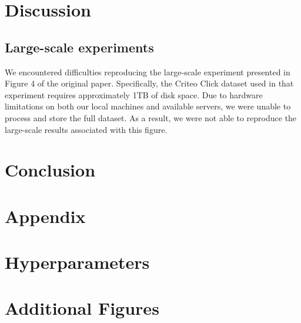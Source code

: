 \documentclass[a4paper,twocolumn]{article} %
\begin{document}
\begin{table}[ht]
\centering
{}
\caption{Comparison of accuracy using all features. p-values are from one-sample t-tests against Lemhadri (2021)~\cite{lemhadri2021lassonet} and Yasuda (2023)'s reported means.}
\label{tab:all-feature-pval}
\end{table}
\section{Discussion}


\subsection{ Large-scale experiments}
We encountered difficulties reproducing the large-scale experiment presented in Figure 4 of the original paper. Specifically, the Criteo Click dataset used in that experiment requires approximately 1TB of disk space. 
Due to hardware limitations on both our local machines and available servers, we were unable to process and store the full dataset. 
As a result, we were not able to reproduce the large-scale results associated with this figure.

\section{Conclusion}





\clearpage
\appendix
\section*{Appendix}
\section{Hyperparameters}

\section{Additional Figures}
\end{document}
